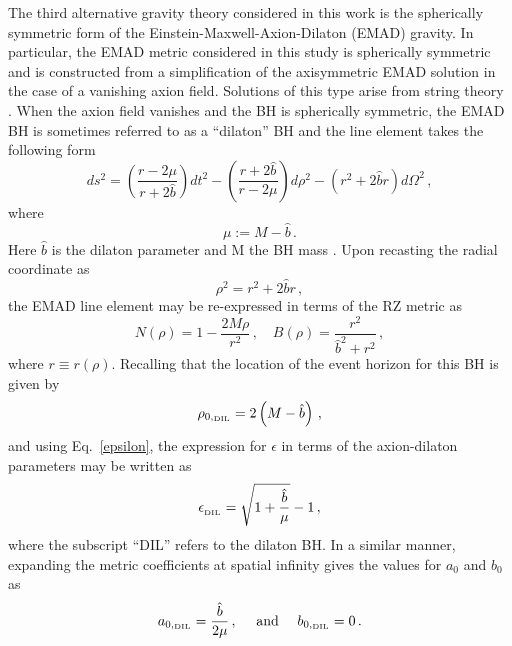 \documentclass[a4paper,aps,twocolumn,showpacs,showkeys,nofootinbib,preprintnumbers,superscriptaddress,amsmath,amssymb,amsfonts]{revtex4-1}
\begin{document}
The third alternative gravity theory considered in this work is the spherically
symmetric form of the Einstein-Maxwell-Axion-Dilaton (EMAD) gravity. 
In particular, the EMAD metric considered in this study is
spherically symmetric and is constructed from a simplification of the
axisymmetric EMAD solution \cite{Garcia1995} in the case of a vanishing
axion field. Solutions of this type arise from string theory
\cite{Gibbons1988, Garfinkle1991, Horowitz1991, Shapere1991,
Sen1992}. 
When the axion field vanishes and the BH is spherically symmetric, 
the EMAD BH is sometimes referred to as a ``dilaton'' BH 
and the line element takes the following form
%
\begin{equation} 
\label{EMAD}
ds^2 = \left(\frac{r-2\mu}{r+2\hat{b}}\right)dt^2
           - \left(\frac{r+2\hat{b}}{r-2\mu}\right)d\rho^2
           - (r^2+2\hat{b}r)d\Omega^2 \,,
\end{equation}
%
where
\begin{equation}
\mu := M - \hat{b} \,.
\end{equation}
Here $\hat{b}$ is the dilaton parameter and M the BH mass \citep[see][]{Sen1992}.
Upon recasting the radial coordinate as
\begin{equation}
\rho^2=r^2+2\hat{b}r\,,
\end{equation}
the EMAD line element may be re-expressed in terms of the RZ metric as
%
\begin{equation}
N\left( \rho \right) = 1-\frac{2M\rho}{r^2} \,, \quad B\left( \rho \right) = \frac{r^2}{\hat{b}^2+r^2} \,,
\end{equation}
%
where $r\equiv r(\rho)$.
Recalling that the location of the event horizon for this BH is given by
%
\begin{equation}
\rho_{0,_{{\rm DIL}}}= 2\left( M - \hat{b} \right) \,,
\end{equation}
%
and using Eq.~\eqref{epsilon}, the expression for $\epsilon$ in terms of
the axion-dilaton parameters may be written as
%
\begin{equation}
\epsilon_{_{\rm DIL}} = \sqrt{1+\frac{\hat{b}}{\mu}}-1 \,,
\end{equation}
where the subscript ``DIL'' refers to the dilaton BH.
In a similar manner, expanding the metric coefficients at spatial
infinity gives the values for $a_0$ and $b_0$ as
%
\begin{eqnarray}
\label{a0EMAD}
a_{0,_{{\rm DIL}}} = \frac{\hat{b}}{2\mu}\,, \quad {\text{ \rm and }}
                                              \quad b_{0,_{{\rm DIL}}}=0 \,.
\end{eqnarray}
\end{document}
